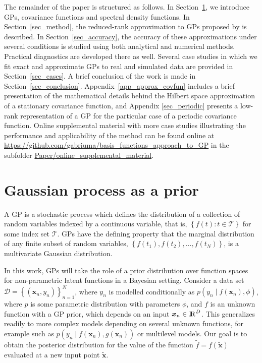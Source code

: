 The remainder of the paper is structured as follows. In Section~\ref{ch4_gp}, we introduce GPs, covariance functions and spectral density functions. In Section~\ref{sec_method}, the reduced-rank approximation to GPs proposed by \citet{solin2018hilbert} is described. In Section~\ref{sec_accuracy}, the accuracy of these approximations under several conditions is studied using both analytical and numerical methods.  Practical diagnostics are developed there as well. Several case studies in which we fit exact and approximate GPs to real and simulated data are provided in Section~\ref{sec_cases}. A brief conclusion of the work is made in Section~\ref{sec_conclusion}. Appendix~\ref{app_approx_covfun} includes a brief presentation of the mathematical details behind the Hilbert space approximation of a stationary covariance function, and Appendix \ref{sec_periodic} presents a low-rank representation of a GP for the particular case of a periodic covariance function. Online supplemental material with more case studies illustrating the performance and applicability of the method can be found online at \url{https://github.com/gabriuma/basis_functions_approach_to_GP} in the subfolder \url{Paper/online_supplemental_material}.


\section{Gaussian process as a prior}\label{ch4_gp}

A GP is a stochastic process which defines the distribution of a collection of random variables indexed by a continuous variable, that is, $\left\lbrace f(t): t \in \mathcal{T}\right\rbrace$ for some index set $\mathcal{T}$. GPs have the defining property that the marginal distribution of any finite subset of random variables, $\left\lbrace f(t_1), f(t_2), \hdots, f(t_N) \right\rbrace$, is a multivariate Gaussian distribution.

In this work, GPs will take the role of a prior distribution over function spaces for non-parametric latent functions in a Bayesian setting. Consider a data set $\mathcal{D} = \left\lbrace (\bm{x}_n, y_n) \right\rbrace_{n=1}^N$, where $y_n$ is modelled conditionally as $p(y_n \mid f(\bm{x}_n),\phi)$, where $p$ is some parametric distribution with parameters  $\phi$, and $f$ is an unknown function with a GP prior, which depends on an input $\bm{x}_n\in {\rm I\!R}^D$. This generalizes readily to more complex models depending on several unknown functions, for example such as $p(y_n \mid f(\bm{x}_n),g(\bm{x}_n))$ or multilevel models. Our goal is to obtain the posterior distribution for the value of the function $\tilde{f}=f(\tilde{\bm{x}})$  evaluated at a new input point $\tilde{\bm{x}}$.

